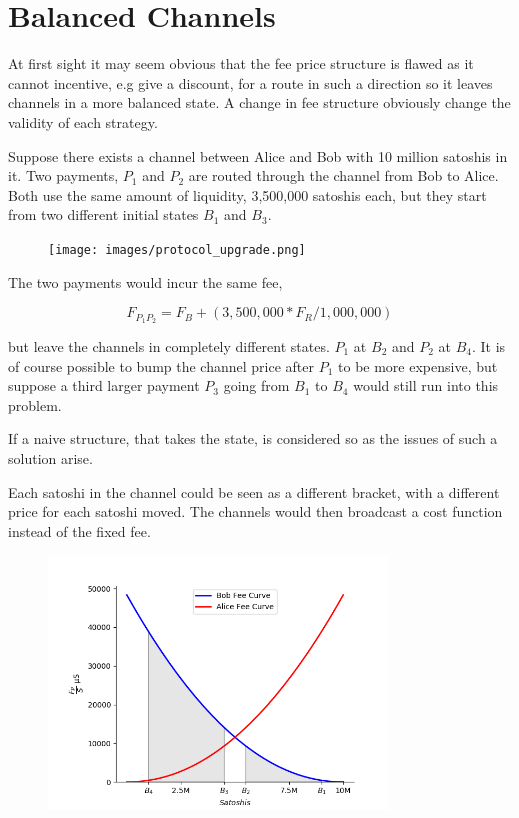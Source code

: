 \section{Balanced Channels}

At first sight it may seem obvious that the fee price structure is flawed as it cannot incentive, e.g give a discount, for a route in such a direction so it leaves channels in a more balanced state. A change in fee structure obviously change the validity of each strategy.

Suppose there exists a channel between Alice and Bob with 10 million satoshis in it. 
Two payments, $P_{1}$ and $P_{2}$ are routed through the channel from Bob to Alice.
Both use the same amount of liquidity, 3,500,000 satoshis each, but they start from two different initial states $B_{1}$ and $B_3$.

\begin{figure}[!htb]
	\hspace*{0.7cm} 
	\centering
	\texttt{[image: images/protocol\_upgrade.png]}
	
	\label{fig:upgrade}
	\hspace*{2mm} 	
\end{figure}

The two payments would incur the same fee, 

\[ F_{P_1 P_2} = F_B + (3,500,000 * F_R / 1,000,000) \]

but leave the channels in completely different states. $P_1$ at $B_2$ and $P_2$ at $B_4$. It is of course possible to bump the channel price after $P_1$ to
be more expensive, but suppose a third larger payment $P_3$ going from $B_1$ to $B_4$ would still run into this problem.

If a naive structure, that takes the state, is considered so as the issues of such a solution arise. 

Each satoshi in the channel could be seen as a different bracket, with a different price for each satoshi moved. The channels would then broadcast a cost function instead of the fixed fee.

\begin{figure}[!htb]
	\hspace*{-0.5cm}
	\centering
	\includegraphics[width=9cm]{images/fee_scheme.png}
	\label{fig:fee scheme}
	\hspace{2mm}
\end{figure}


